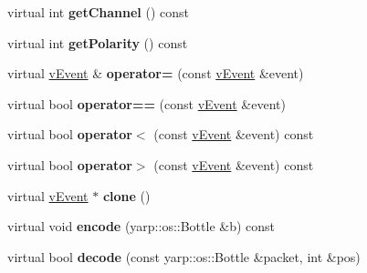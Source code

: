 \begin{DoxyCompactItemize}
\item 
\hypertarget{classemorph_1_1vEvent_a8cb587b03ff0432d8665ff8a2c2d517c}{virtual int {\bfseries get\-Channel} () const }\label{classemorph_1_1vEvent_a8cb587b03ff0432d8665ff8a2c2d517c}

\item 
\hypertarget{classemorph_1_1vEvent_a694ba5711b4bbf8bfd8743b60006d53f}{virtual int {\bfseries get\-Polarity} () const }\label{classemorph_1_1vEvent_a694ba5711b4bbf8bfd8743b60006d53f}

\item 
\hypertarget{classemorph_1_1vEvent_a9e5dea4caa64e1dedece71339be427ac}{virtual \hyperlink{classemorph_1_1vEvent}{v\-Event} \& {\bfseries operator=} (const \hyperlink{classemorph_1_1vEvent}{v\-Event} \&event)}\label{classemorph_1_1vEvent_a9e5dea4caa64e1dedece71339be427ac}

\item 
\hypertarget{classemorph_1_1vEvent_a48e0878410a8da3449220fe7f337a159}{virtual bool {\bfseries operator==} (const \hyperlink{classemorph_1_1vEvent}{v\-Event} \&event)}\label{classemorph_1_1vEvent_a48e0878410a8da3449220fe7f337a159}

\item 
\hypertarget{classemorph_1_1vEvent_af2901f070adea52495d9b0414ed90e95}{virtual bool {\bfseries operator$<$} (const \hyperlink{classemorph_1_1vEvent}{v\-Event} \&event) const }\label{classemorph_1_1vEvent_af2901f070adea52495d9b0414ed90e95}

\item 
\hypertarget{classemorph_1_1vEvent_a8a55fc59b331f93cb95829dee21ef3dc}{virtual bool {\bfseries operator$>$} (const \hyperlink{classemorph_1_1vEvent}{v\-Event} \&event) const }\label{classemorph_1_1vEvent_a8a55fc59b331f93cb95829dee21ef3dc}

\item 
\hypertarget{classemorph_1_1vEvent_a73d24674b7e5ece51cda67f4e10bd312}{virtual \hyperlink{classemorph_1_1vEvent}{v\-Event} $\ast$ {\bfseries clone} ()}\label{classemorph_1_1vEvent_a73d24674b7e5ece51cda67f4e10bd312}

\item 
\hypertarget{classemorph_1_1vEvent_ae2eb881db166370eac07f9e4bcd22cdf}{virtual void {\bfseries encode} (yarp\-::os\-::\-Bottle \&b) const }\label{classemorph_1_1vEvent_ae2eb881db166370eac07f9e4bcd22cdf}

\item 
\hypertarget{classemorph_1_1vEvent_a75b5c46b819fc8693749e4eb0ab3e91f}{virtual bool {\bfseries decode} (const yarp\-::os\-::\-Bottle \&packet, int \&pos)}\label{classemorph_1_1vEvent_a75b5c46b819fc8693749e4eb0ab3e91f}


\end{DoxyCompactItemize}

